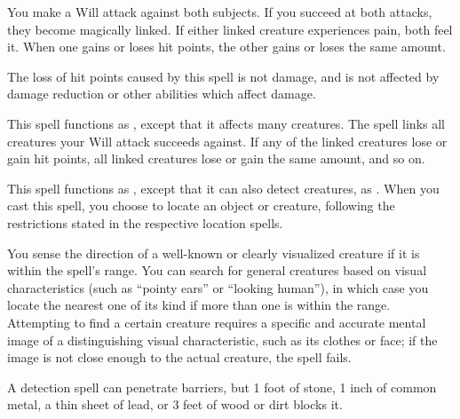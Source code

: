 \spelldur{\durshort}
\begin{spelleffect}
    You make a Will attack against both subjects. If you succeed at both attacks, they become magically linked. If either linked creature experiences pain, both feel it. When one gains or loses hit points, the other gains or loses the same amount.
\end{spelleffect}
\begin{spellnotes}
  The loss of hit points caused by this spell is not damage, and is not affected by damage reduction or other abilities which affect damage.
\end{spellnotes}

\begin{spelleffect}
  This spell functions as , except that it affects many creatures. The spell links all creatures your Will attack succeeds against. If any of the linked creatures lose or gain hit points, all linked creatures lose or gain the same amount, and so on.
\end{spelleffect}

\spellrng{\rngext}
\begin{spelleffect}
  This spell functions as , except that it can also detect creatures, as . When you cast this spell, you choose to locate an object or creature, following the restrictions stated in the respective location spells.
\end{spelleffect}

\spellrng{\rngmed}
\begin{spelleffect}
  You sense the direction of a well-known or clearly visualized creature if it is within the spell's range. You can search for general creatures based on visual characteristics (such as ``pointy ears'' or ``looking human''), in which case you locate the nearest one of its kind if more than one is within the range. Attempting to find a certain creature requires a specific and accurate mental image of a distinguishing visual characteristic, such as its clothes or face; if the image is not close enough to the actual creature, the spell fails.
\end{spelleffect}
\begin{spellnotes}
  A detection spell can penetrate barriers, but 1 foot of stone, 1 inch of common metal, a thin sheet of lead, or 3 feet of wood or dirt blocks it.
\end{spellnotes}

